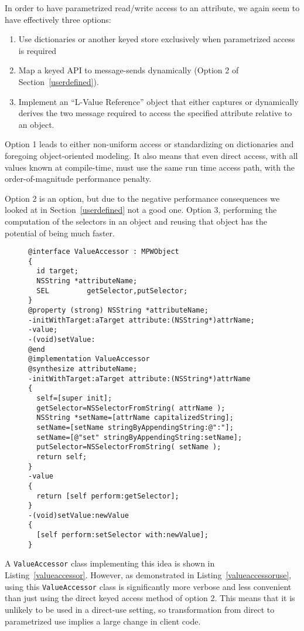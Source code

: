 \documentclass[preprint]{sigplanconf}
\begin{document}
In order to have parametrized read/write access to an attribute, we again seem to have effectively
three options:

\begin{enumerate}
\item Use dictionaries or another keyed store exclusively when parametrized access is required
\item Map a keyed API to message-sends dynamically (Option 2 of Section~\ref{userdefined}).
\item Implement an ``L-Value Reference'' object that either captures or dynamically derives 
	the two message required to access the specified attribute relative to an object.
\end{enumerate}


Option 1 leads to either non-uniform access or standardizing on dictionaries and foregoing 
object-oriented modeling.   It also means that even direct access, with all values known
at compile-time, must use the same run time access path, with the order-of-magnitude
performance penalty.
 
Option 2 is an option, but due to the negative performance
consequences we looked at in
Section~\ref{userdefined} not a good one.   Option 3,  performing the computation of the selectors
in an object and reusing that object has the potential of being much faster. 

\begin{figure}[htbp]
\begin{lstlisting}[style=numbers,label=valueaccessor,caption=Class encapsulating message-based attribute access.]
@interface ValueAccessor : MPWObject
{
  id target;
  NSString *attributeName;
  SEL         getSelector,putSelector;
}
@property (strong) NSString *attributeName;
-initWithTarget:aTarget attribute:(NSString*)attrName;
-value;
-(void)setValue:
@end
@implementation ValueAccessor
@synthesize attributeName;
-initWithTarget:aTarget attribute:(NSString*)attrName
{
  self=[super init];
  getSelector=NSSelectorFromString( attrName );
  NSString *setName=[attrName capitalizedString];
  setName=[setName stringByAppendingString:@":"];
  setName=[@"set" stringByAppendingString:setName];
  putSelector=NSSelectorFromString( setName );
  return self;
}
-value
{
  return [self perform:getSelector];
}
-(void)setValue:newValue
{
  [self perform:setSelector with:newValue];
}
\end{lstlisting}
\end{figure}

A {\tt ValueAccessor} class implementing this idea is shown in Listing~\ref{valueaccessor}.  However, 
as demonstrated in Listing~\ref{valueaccessoruse}, using this
{\tt ValueAccessor} class is significantly more verbose and less convenient than just using the 
direct keyed access method of option 2.  This means that it is unlikely to be used in a direct-use
setting, so transformation from direct to parametrized use implies a large change in client code.
\end{document}
